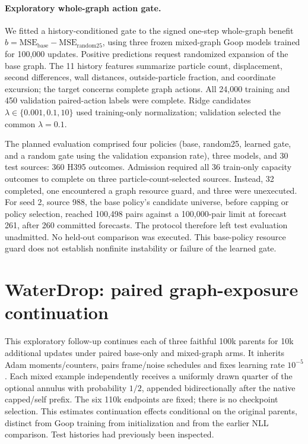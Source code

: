 \paragraph{Exploratory whole-graph action gate.}
We fitted a history-conditioned gate to the signed one-step whole-graph
benefit $b=\mathrm{MSE}_{\mathrm{base}}-\mathrm{MSE}_{\mathrm{random25}}$,
using three frozen mixed-graph Goop models trained for 100,000 updates.
Positive predictions request randomized expansion of the base graph.
The 11 history features summarize particle count, displacement,
second differences, wall distances, outside-particle fraction,
and coordinate excursion; the target concerns complete graph actions.
All 24,000 training and 450 validation paired-action labels were complete.
Ridge candidates $\lambda\in\{0.001,0.1,10\}$ used training-only
normalization; validation selected the common $\lambda=0.1$.

The planned evaluation comprised four policies (base, random25, learned
gate, and a random gate using the validation expansion rate), three models, and
30 test sources: 360 H395 outcomes. Admission required all 36 train-only
capacity outcomes to complete on three particle-count-selected sources.
Instead, 32 completed, one encountered a graph resource guard, and three
were unexecuted. For seed 2, source 988, the base policy's candidate
universe, before capping or policy selection, reached 100,498 pairs against
a 100,000-pair limit at forecast
261, after 260 committed forecasts. The protocol therefore left test
evaluation unadmitted. No held-out comparison was executed. This base-policy resource guard
does not establish nonfinite instability or failure of the learned gate.


\section{WaterDrop: paired graph-exposure continuation}
\label{sec:waterdrop-110k-exposure}
This exploratory follow-up continues each of three faithful 100k parents for 10k additional updates under paired base-only and mixed-graph arms. It inherits Adam moments/counters, pairs frame/noise schedules and fixes learning rate $10^{-5}$. Each mixed example independently receives a uniformly drawn quarter of the optional annulus with probability $1/2$, appended bidirectionally after the native capped/self prefix. The six 110k endpoints are fixed; there is no checkpoint selection. This estimates continuation effects conditional on the original parents, distinct from Goop training from initialization and from the earlier NLL comparison. Test histories had previously been inspected.


